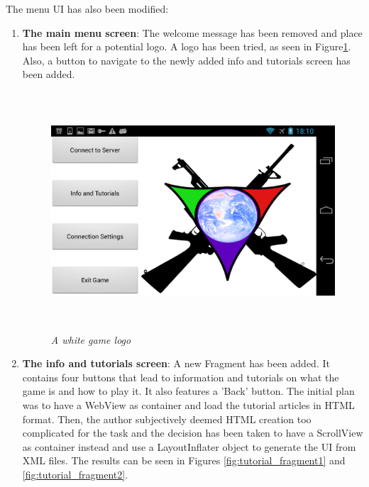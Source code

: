 The menu UI has also been modified:
\begin{enumerate}
  \item \textbf{The main menu screen}: The welcome message has been removed and
  place has been left for a potential logo. A logo has been tried, as seen in
  Figure\ref{fig:logo_white}. Also, a button to navigate to the newly added info
  and tutorials screen has been added.
  
  \begin{figure}
  \includegraphics[height=3.5in,width=6.23in]{./images/android_screenshots/logo_white.png}
  \caption{\small \sl A white game logo \label{fig:logo_white}}
  \end{figure}
  
  \item \textbf{The info and tutorials screen}: A new Fragment has been added.
  It contains four buttons that lead to information and tutorials on what the
  game is and how to play it. It also features a 'Back' button. The initial plan
  was to have a WebView as container and load the tutorial articles in HTML
  format. Then, the author subjectively deemed HTML creation too complicated for
  the task and the decision has been taken to have a ScrollView as container
  instead and use a LayoutInflater object to generate the UI from XML files. The
  results can be seen in Figures \ref{fig:tutorial_fragment1} and
  \ref{fig:tutorial_fragment2}.
  

\end{enumerate}
